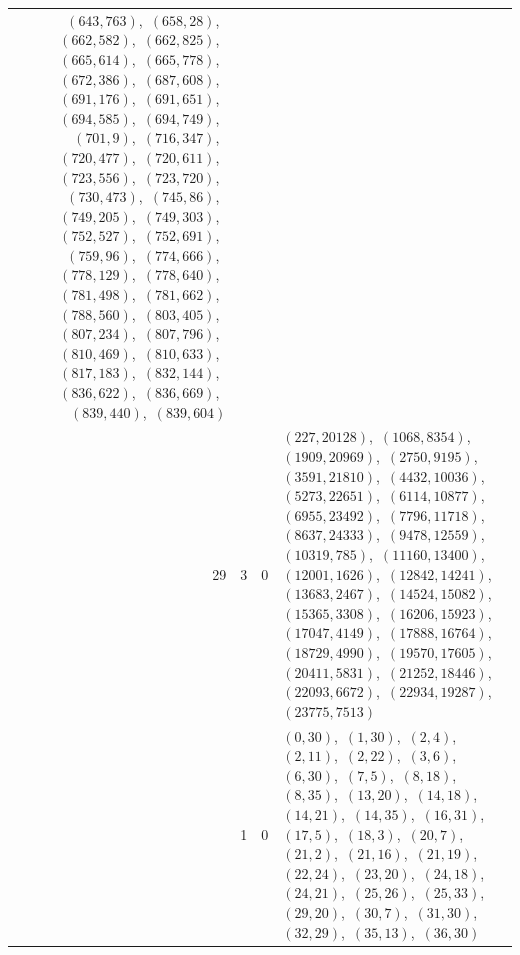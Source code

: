 \documentclass[11pt]{article}
\begin{document}
\begin{longtable}{@{}rrl>{\raggedright\arraybackslash}p{}@{}}
$(643,763)$,\allowbreak\ $(658,28)$,\allowbreak\ $(662,582)$,\allowbreak\ $(662,825)$,\allowbreak\ $(665,614)$,\allowbreak\ $(665,778)$,\allowbreak\ $(672,386)$,\allowbreak\ $(687,608)$,\allowbreak\ $(691,176)$,\allowbreak\ $(691,651)$,\allowbreak\ $(694,585)$,\allowbreak\ $(694,749)$,\allowbreak\ $(701,9)$,\allowbreak\ $(716,347)$,\allowbreak\ $(720,477)$,\allowbreak\ $(720,611)$,\allowbreak\ $(723,556)$,\allowbreak\ $(723,720)$,\allowbreak\ $(730,473)$,\allowbreak\ $(745,86)$,\allowbreak\ $(749,205)$,\allowbreak\ $(749,303)$,\allowbreak\ $(752,527)$,\allowbreak\ $(752,691)$,\allowbreak\ $(759,96)$,\allowbreak\ $(774,666)$,\allowbreak\ $(778,129)$,\allowbreak\ $(778,640)$,\allowbreak\ $(781,498)$,\allowbreak\ $(781,662)$,\allowbreak\ $(788,560)$,\allowbreak\ $(803,405)$,\allowbreak\ $(807,234)$,\allowbreak\ $(807,796)$,\allowbreak\ $(810,469)$,\allowbreak\ $(810,633)$,\allowbreak\ $(817,183)$,\allowbreak\ $(832,144)$,\allowbreak\ $(836,622)$,\allowbreak\ $(836,669)$,\allowbreak\ $(839,440)$,\allowbreak\ $(839,604)$\\
29 & 3 & $0$ & $(227,20128)$,\allowbreak\ $(1068,8354)$,\allowbreak\ $(1909,20969)$,\allowbreak\ $(2750,9195)$,\allowbreak\ $(3591,21810)$,\allowbreak\ $(4432,10036)$,\allowbreak\ $(5273,22651)$,\allowbreak\ $(6114,10877)$,\allowbreak\ $(6955,23492)$,\allowbreak\ $(7796,11718)$,\allowbreak\ $(8637,24333)$,\allowbreak\ $(9478,12559)$,\allowbreak\ $(10319,785)$,\allowbreak\ $(11160,13400)$,\allowbreak\ $(12001,1626)$,\allowbreak\ $(12842,14241)$,\allowbreak\ $(13683,2467)$,\allowbreak\ $(14524,15082)$,\allowbreak\ $(15365,3308)$,\allowbreak\ $(16206,15923)$,\allowbreak\ $(17047,4149)$,\allowbreak\ $(17888,16764)$,\allowbreak\ $(18729,4990)$,\allowbreak\ $(19570,17605)$,\allowbreak\ $(20411,5831)$,\allowbreak\ $(21252,18446)$,\allowbreak\ $(22093,6672)$,\allowbreak\ $(22934,19287)$,\allowbreak\ $(23775,7513)$\\
\addlinespace[3pt]
37 & 1 & $0$ & $(0,30)$,\allowbreak\ $(1,30)$,\allowbreak\ $(2,4)$,\allowbreak\ $(2,11)$,\allowbreak\ $(2,22)$,\allowbreak\ $(3,6)$,\allowbreak\ $(6,30)$,\allowbreak\ $(7,5)$,\allowbreak\ $(8,18)$,\allowbreak\ $(8,35)$,\allowbreak\ $(13,20)$,\allowbreak\ $(14,18)$,\allowbreak\ $(14,21)$,\allowbreak\ $(14,35)$,\allowbreak\ $(16,31)$,\allowbreak\ $(17,5)$,\allowbreak\ $(18,3)$,\allowbreak\ $(20,7)$,\allowbreak\ $(21,2)$,\allowbreak\ $(21,16)$,\allowbreak\ $(21,19)$,\allowbreak\ $(22,24)$,\allowbreak\ $(23,20)$,\allowbreak\ $(24,18)$,\allowbreak\ $(24,21)$,\allowbreak\ $(25,26)$,\allowbreak\ $(25,33)$,\allowbreak\ $(29,20)$,\allowbreak\ $(30,7)$,\allowbreak\ $(31,30)$,\allowbreak\ $(32,29)$,\allowbreak\ $(35,13)$,\allowbreak\ $(36,30)$\\

\end{longtable}
\end{document}
